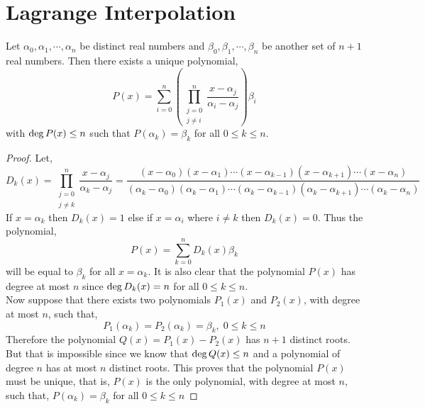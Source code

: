 \section{Lagrange Interpolation}

\begin{theorem}\label{thm:lagrange-interpol}
    Let $\alpha_{0}, \alpha_{1},\cdots , \alpha_{n}$ be distinct real numbers and 
    $\beta_{0}, \beta_{1}, \cdots, \beta_{n}$ be another set of $n+1$ real numbers. 
    Then there exists a unique polynomial,
    \[
    P(x) = 
    \sum_{i=0}^{n} \left( \prod_{\substack{j=0\\ j\neq i}}^{n} \frac{x - \alpha_{j}}{\alpha_{i} - \alpha_{j}} \right) \beta_{i}
    \]
    with $\operatorname{deg} P(x) \leq n$ such that $P(\alpha_{k}) = \beta_{k}$ for all $0\leq k \leq n$.
\end{theorem}
\begin{proof}
    Let,
    \[
    D_{k}(x) = \prod_{\substack{j=0 \\ j\neq k}}^{n} \frac{x - \alpha_{j}}{\alpha_{k} - \alpha_{j}} = 
    \frac{(x-\alpha_{0})(x-\alpha_{1})\cdots (x - \alpha_{k-1})(x - \alpha_{k+1}) \cdots (x - \alpha_{n})}
         {(\alpha_{k}-\alpha_{0})(\alpha_{k}-\alpha_{1})\cdots (\alpha_{k} - \alpha_{k-1})(\alpha_{k} - \alpha_{k+1}) \cdots (\alpha_{k} - \alpha_{n})}
    \]
    If $x=\alpha_k$ then $D_k(x) = 1$ else if $x=\alpha_i$ where 
    $i \neq k$ then $D_k(x)=0$. Thus the polynomial,
    \[ P(x) = \sum_{k=0}^n D_k(x) \beta_k \]
    will be equal to $\beta_k$ for all $x=\alpha_k$. It is also clear that the 
    polynomial $P(x)$ has degree at most $n$ since $\operatorname{deg} D_k(x)=n$ for all 
    $0 \leq k \leq n$. \\
    Now suppose that there exists two polynomials $P_1(x)$ and $P_2(x)$, with degree at 
    most $n$, such that,
    \[ P_1(\alpha_k) = P_2(\alpha_k) = \beta_k, \; 0\leq k \leq n\]
    Therefore the polynomial $Q(x) = P_1(x) - P_2(x)$ has $n+1$ distinct roots. 
    But that is impossible since we know that $\operatorname{deg} Q(x) \leq n$ and 
    a polynomial of degree $n$ has at most $n$ distinct roots. This proves that 
    the polynomial $P(x)$ must be unique, that is, $P(x)$ is the only polynomial, with 
    degree at most $n$, such that, 
    $P(\alpha_k) = \beta_k$ for all $0 \leq k \leq n$
\end{proof}

